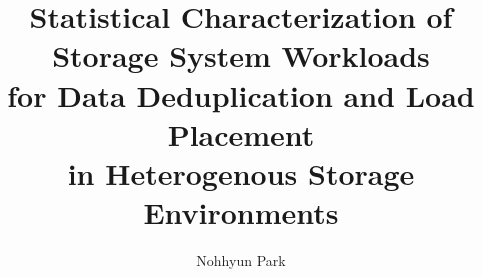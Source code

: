 \phd %

\title{\bf Statistical Characterization of Storage System Workloads
\\
for Data Deduplication and Load Placement 
\\
in Heterogenous Storage Environments}
\author{Nohhyun Park}


\abstract{}
\acknowledgements{}
\dedication{}
%

\beforepreface 

\figurespage
\tablespage

\afterpreface            
